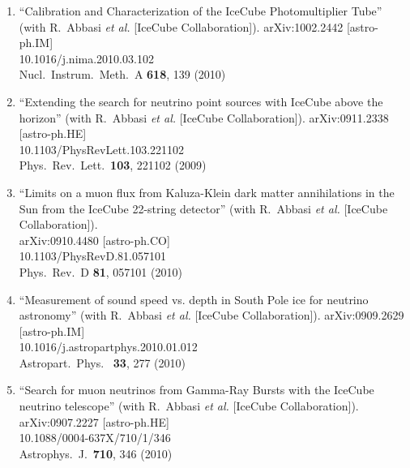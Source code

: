 \begin{enumerate}
\item ``Calibration and Characterization of the IceCube Photomultiplier
  Tube'' (with R.~Abbasi {\it et al.}  [IceCube Collaboration]). arXiv:1002.2442 [astro-ph.IM] \\{}10.1016/j.nima.2010.03.102
  \\{}Nucl.\ Instrum.\ Meth.\ A {\bf 618}, 139 (2010) %


\item ``Extending the search for neutrino point sources with IceCube above
  the horizon'' (with R.~Abbasi {\it et al.}  [IceCube Collaboration]). arXiv:0911.2338 [astro-ph.HE] \\{}10.1103/PhysRevLett.103.221102
  \\{}Phys.\ Rev.\ Lett.\ {\bf 103}, 221102 (2009) %


\item ``Limits on a muon flux from Kaluza-Klein dark matter annihilations in
  the Sun from the IceCube 22-string detector'' (with R.~Abbasi {\it et
    al.}  [IceCube Collaboration]).  \\{}arXiv:0910.4480 [astro-ph.CO]
  \\{}10.1103/PhysRevD.81.057101 \\{}Phys.\ Rev.\ D {\bf 81}, 057101
  (2010) %


\item ``Measurement of sound speed vs. depth in South Pole ice for neutrino
  astronomy'' (with R.~Abbasi {\it et al.}  [IceCube Collaboration]). arXiv:0909.2629 [astro-ph.IM]
  \\{}10.1016/j.astropartphys.2010.01.012 \\{}Astropart.\ Phys.\ {\bf
    33}, 277 (2010) %


\item ``Search for muon neutrinos from Gamma-Ray Bursts with the IceCube
  neutrino telescope'' (with R.~Abbasi {\it et al.}  [IceCube
    Collaboration]).  \\{}arXiv:0907.2227 [astro-ph.HE]
  \\{}10.1088/0004-637X/710/1/346 \\{}Astrophys.\ J.\ {\bf 710}, 346
  (2010) %



\end{enumerate}

